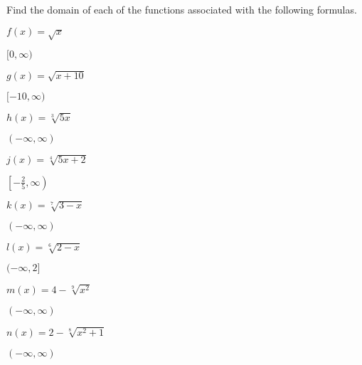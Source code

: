 \begin{exercises}
\begin{problem}
Find the domain of each of the functions associated with the following formulas.
\begin{multicols}{4}
	\begin{subproblem}
		$f(x)=\sqrt{x}$
		\begin{shortsolution}
			$[0,\infty)$  
		\end{shortsolution}
	\end{subproblem}
	\begin{subproblem}
		$g(x)=\sqrt{x+10}$  
		\begin{shortsolution}
			$[-10,\infty)$  
		\end{shortsolution}
	\end{subproblem}
	\begin{subproblem}
		$h(x)=\sqrt[3]{5x}$  
		\begin{shortsolution}
			$(-\infty,\infty)$  
		\end{shortsolution}
	\end{subproblem}
	\begin{subproblem}
		$j(x)=\sqrt[4]{5x+2}$  
		\begin{shortsolution}
			$\left[ -\frac{2}{5},\infty\right)$  
		\end{shortsolution}
	\end{subproblem}
	\begin{subproblem}
		$k(x)=\sqrt[7]{3-x}$  
		\begin{shortsolution}
			$(-\infty,\infty)$  
		\end{shortsolution}
	\end{subproblem}
	\begin{subproblem}
		$l(x)=\sqrt[6]{2-x}$  
		\begin{shortsolution}
			$(-\infty,2]$  
		\end{shortsolution}
	\end{subproblem}
	\begin{subproblem}
		$m(x)=4-\sqrt[9]{x^2}$  
		\begin{shortsolution}
			$(-\infty,\infty)$  
		\end{shortsolution}
	\end{subproblem}
	\begin{subproblem}
		$n(x)=2-\sqrt[8]{x^2+1}$  
		\begin{shortsolution}
			$(-\infty,\infty)$  
		\end{shortsolution}
	\end{subproblem}
\end{multicols}
\end{problem}
\end{exercises}


